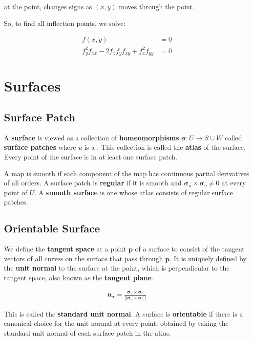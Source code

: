 \documentclass[11pt]{article}
\begin{document}
at the point, changes signs as \(\left(x,y\right)\) moves through the point.

So, to find all inflection points, we solve:

\begin{align*}
    f\left(x,y\right) &= 0 \\
    f_{y}^{2}f_{xx}-2f_{x}f_{y}f_{xy}+f_{x}^{2}f_{yy} &= 0
\end{align*}

\section{Surfaces}
\label{sec:orgb384e6f}
\subsection{Surface Patch}
\label{sec:org15ea1f2}
A \textbf{surface} is viewed as a collection of \textbf{homeomorphisms} \(\boldsymbol{\sigma} : U \rightarrow S \cup W\) called \textbf{surface patches} where \(u\) is a . This collection is called the \textbf{atlas} of the surface. Every point of the surface is in at least one surface patch.

A map is smooth if each component of the map has continuous partial derivatives of all orders. A surface patch is \textbf{regular} if it is smooth and \(\boldsymbol{\sigma}_{u} \times \boldsymbol{\sigma}_{v} \neq 0\) at every point of \(U\). A \textbf{smooth surface} is one whose atlas consists of regular surface patches.

\subsection{Orientable Surface}
\label{sec:org04e7d5c}
We define the \textbf{tangent space} at a point \(\boldsymbol{p}\) of a surface to consist of the tangent vectors of all curves on the surface that pass through \(\boldsymbol{p}\). It is uniquely defined by the \textbf{unit normal} to the surface at the point, which is perpendicular to the tangent space, also known as the \textbf{tangent plane}.

\begin{align*}
    \boldsymbol{n}_{\sigma} = \frac{\boldsymbol{\sigma}_{u} \times \boldsymbol{\sigma}_{v}}{\lvert\lvert \boldsymbol{\sigma}_{u} \times \boldsymbol{\sigma}_{v} \lvert\lvert}
\end{align*}

This is called the \textbf{standard unit normal}. A surface is \textbf{orientable} if there is a canonical choice for the unit normal at every point, obtained by taking the standard unit normal of each surface patch in the atlas.
\end{document}
